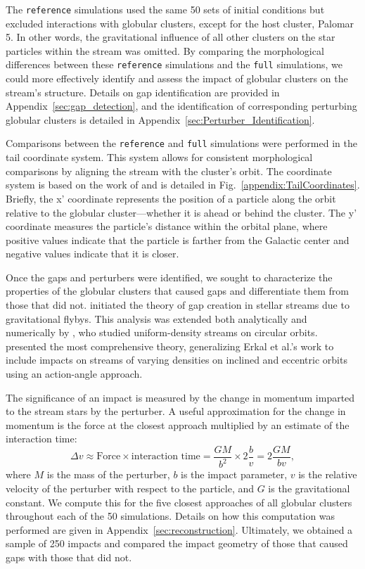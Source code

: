 \documentclass{aa}
\begin{document}
    The \texttt{reference} simulations used the same 50 sets of initial conditions but excluded interactions with globular clusters, except for the host cluster, Palomar 5. In other words, the gravitational influence of all other clusters on the star particles within the stream was omitted. By comparing the morphological differences between these \texttt{reference} simulations and the \texttt{full} simulations, we could more effectively identify and assess the impact of globular clusters on the stream's structure. Details on gap identification are provided in Appendix~\ref{sec:gap_detection}, and the identification of corresponding perturbing globular clusters is detailed in Appendix~\ref{sec:Perturber_Identification}.


    Comparisons between the \texttt{reference} and \texttt{full} simulations were performed in the tail coordinate system. This system allows for consistent morphological comparisons by aligning the stream with the cluster's orbit. The coordinate system is based on the work of \citet{2004AJ....127.2753D} and is detailed in Fig.~\ref{appendix:TailCoordinates}. Briefly, the x' coordinate represents the position of a particle along the orbit relative to the globular cluster—whether it is ahead or behind the cluster. The y' coordinate measures the particle's distance within the orbital plane, where positive values indicate that the particle is farther from the Galactic center and negative values indicate that it is closer.

    
    Once the gaps and perturbers were identified, we sought to characterize the properties of the globular clusters that caused gaps and differentiate them from those that did not. \citet{2013ApJ...775...90C} initiated the theory of gap creation in stellar streams due to gravitational flybys. This analysis was extended both analytically and numerically by \citet{2015MNRAS.450.1136E}, who studied uniform-density streams on circular orbits. \citet{2016MNRAS.457.3817S} presented the most comprehensive theory, generalizing Erkal et al.'s work to include impacts on streams of varying densities on inclined and eccentric orbits using an action-angle approach.

    The significance of an impact is measured by the change in momentum imparted to the stream stars by the perturber. A useful approximation for the change in momentum is the force at the closest approach multiplied by an estimate of the interaction time: \begin{equation} \label{eq:change_in_momentum} \Delta v \approx \text{Force} \times \text{interaction time} = \frac{GM}{b^2} \times 2\frac{b}{v} = 2\frac{GM}{bv}, \end{equation} where $M$ is the mass of the perturber, $b$ is the impact parameter, $v$ is the relative velocity of the perturber with respect to the particle, and $G$ is the gravitational constant. We compute this for the five closest approaches of all globular clusters throughout each of the 50 simulations. Details on how this computation was performed are given in Appendix~\ref{sec:reconstruction}. Ultimately, we obtained a sample of 250 impacts and compared the impact geometry of those that caused gaps with those that did not.
    
\end{document}
